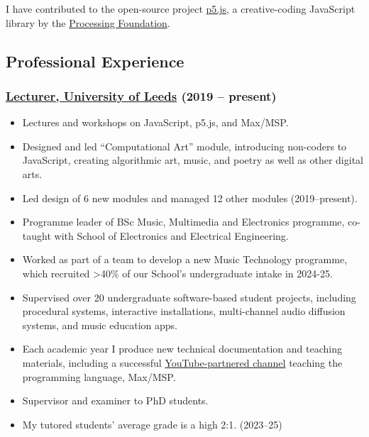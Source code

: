 \documentclass[10pt,a4paper]{article}
\providecommand{\tightlist}{%
  \setlength{\itemsep}{0pt}\setlength{\parskip}{0pt}}
\begin{document}
I have contributed to the open-source project
\href{https://p5js.org/}{p5.js}, a creative-coding JavaScript library by
the \href{https://processingfoundation.org/}{Processing Foundation}.

\subsection{Professional Experience}\label{professional-experience}

\subsubsection{\texorpdfstring{\href{https://ahc.leeds.ac.uk/music/staff/488/dr-oliver-thurley}{Lecturer,
University of Leeds} (2019 --
present)}{Lecturer, University of Leeds (2019 -- present)}}\label{lecturer-university-of-leeds-2019-present}

\begin{itemize}
\tightlist
\item
  Lectures and workshops on JavaScript, p5.js, and Max/MSP.
\item
  Designed and led ``Computational Art'' module, introducing non-coders
  to JavaScript, creating algorithmic art, music, and poetry as well as
  other digital arts.
\item
  Led design of 6 new modules and managed 12 other modules
  (2019--present).
\item
  Programme leader of BSc Music, Multimedia and Electronics programme,
  co-taught with School of Electronics and Electrical Engineering.
\item
  Worked as part of a team to develop a new Music Technology programme,
  which recruited \textgreater40\% of our School's undergraduate intake
  in 2024-25.
\item
  Supervised over 20 undergraduate software-based student projects,
  including procedural systems, interactive installations, multi-channel
  audio diffusion systems, and music education apps.
\item
  Each academic year I produce new technical documentation and teaching
  materials, including a successful
  \href{https://www.youtube.com/@thrly}{YouTube-partnered channel}
  teaching the programming language, Max/MSP.
\item
  Supervisor and examiner to PhD students.
\item
  My tutored students' average grade is a high 2:1. (2023--25)
\end{itemize}
\end{document}
